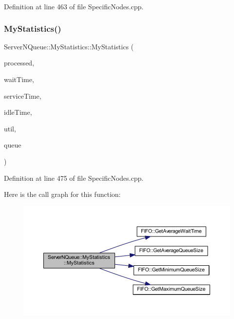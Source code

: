 Definition at line 463 of file Specific\+Nodes.\+cpp.

\mbox{\label{class_server_n_queue_1_1_my_statistics_ac6ab7a50b89919760fd2eb60a777c1bd}} 
\subsubsection{\texorpdfstring{My\+Statistics()}{MyStatistics()}\hspace{0.1cm}{\footnotesize\ttfamily [2/2]}}
{\footnotesize\ttfamily Server\+N\+Queue\+::\+My\+Statistics\+::\+My\+Statistics (\begin{DoxyParamCaption}\item[{int}]{processed,  }\item[{double}]{wait\+Time,  }\item[{double}]{service\+Time,  }\item[{double}]{idle\+Time,  }\item[{double}]{util,  }\item[{\hyperlink{class_f_i_f_o}{F\+I\+FO} $\ast$}]{queue }\end{DoxyParamCaption})\hspace{0.3cm}{\ttfamily [inline]}}



Definition at line 475 of file Specific\+Nodes.\+cpp.

Here is the call graph for this function\+:
\nopagebreak
\begin{figure}[H]
\begin{center}
\leavevmode
\includegraphics[width=350pt]{class_server_n_queue_1_1_my_statistics_ac6ab7a50b89919760fd2eb60a777c1bd_cgraph}
\end{center}
\end{figure}


